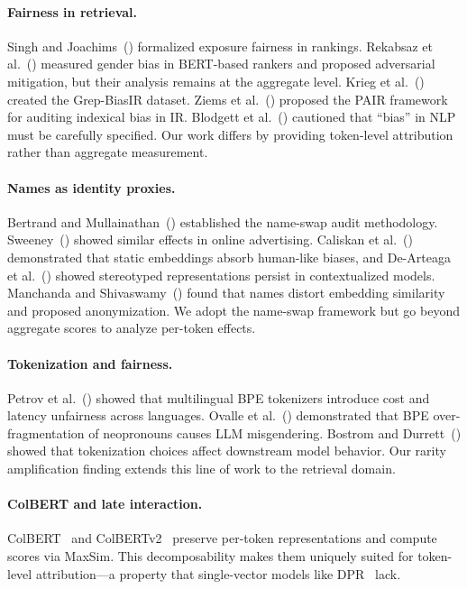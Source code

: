 \documentclass[11pt]{article}
\begin{document}
\paragraph{Fairness in retrieval.}
Singh and Joachims~(\citeyear{singh2018}) formalized exposure fairness in rankings. Rekabsaz et al.~(\citeyear{rekabsaz2021}) measured gender bias in BERT-based rankers and proposed adversarial mitigation, but their analysis remains at the aggregate level. Krieg et al.~(\citeyear{krieg2023}) created the Grep-BiasIR dataset. Ziems et al.~(\citeyear{ziems2024}) proposed the PAIR framework for auditing indexical bias in IR. Blodgett et al.~(\citeyear{blodgett2020}) cautioned that ``bias'' in NLP must be carefully specified. Our work differs by providing token-level attribution rather than aggregate measurement.

\paragraph{Names as identity proxies.}
Bertrand and Mullainathan~(\citeyear{bertrand2004}) established the name-swap audit methodology. Sweeney~(\citeyear{sweeney2013}) showed similar effects in online advertising. Caliskan et al.~(\citeyear{caliskan2017}) demonstrated that static embeddings absorb human-like biases, and De-Arteaga et al.~(\citeyear{dearteaga2019}) showed stereotyped representations persist in contextualized models. Manchanda and Shivaswamy~(\citeyear{manchanda2025}) found that names distort embedding similarity and proposed anonymization. We adopt the name-swap framework but go beyond aggregate scores to analyze per-token effects.

\paragraph{Tokenization and fairness.}
Petrov et al.~(\citeyear{petrov2023}) showed that multilingual BPE tokenizers introduce cost and latency unfairness across languages. Ovalle et al.~(\citeyear{ovalle2024}) demonstrated that BPE over-fragmentation of neopronouns causes LLM misgendering. Bostrom and Durrett~(\citeyear{bostrom2020}) showed that tokenization choices affect downstream model behavior. Our rarity amplification finding extends this line of work to the retrieval domain.

\paragraph{ColBERT and late interaction.}
ColBERT~\citep{khattab2020} and ColBERTv2~\citep{santhanam2022} preserve per-token representations and compute scores via MaxSim. This decomposability makes them uniquely suited for token-level attribution---a property that single-vector models like DPR~\citep{karpukhin2020} lack.
\end{document}

